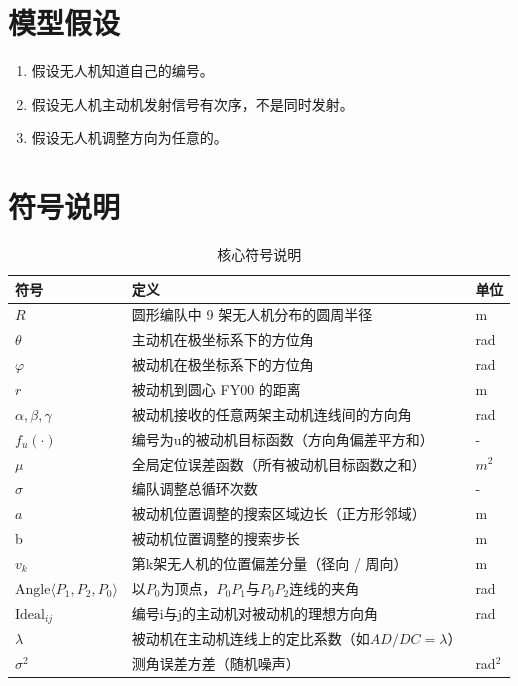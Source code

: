 \documentclass[withoutpreface,bwprint]{cumcmthesis} %
\begin{document}
\section{模型假设}

\begin{enumerate}
    \item 假设无人机知道自己的编号。
    \item 假设无人机主动机发射信号有次序，不是同时发射。
    \item 假设无人机调整方向为任意的。
\end{enumerate}

\section{符号说明}

\begin{table}[H]
    \centering
    \caption{核心符号说明}
    \label{tab_symbols}
    \begin{tabular}{@{}lll@{}}
        \toprule
        \textbf{符号} & \textbf{定义} & \textbf{单位} \\
        \midrule
        $R$  & 圆形编队中 9 架无人机分布的圆周半径 & m\\
        \(\theta\)&主动机在极坐标系下的方位角&rad\\
        \(\varphi\)&被动机在极坐标系下的方位角&rad\\
        $r$&被动机到圆心 FY00 的距离&m\\
        \(\alpha, \beta, \gamma\) & 被动机接收的任意两架主动机连线间的方向角&rad \\ 
        \(f_u(\cdot)\)&编号为u的被动机目标函数（方向角偏差平方和）&-\\
        \(\mu\) & 全局定位误差函数（所有被动机目标函数之和）&$m^2$\\
        \(\sigma\) & 编队调整总循环次数& -\\
        $a$ & 被动机位置调整的搜索区域边长（正方形邻域）& m\\
        b & 被动机位置调整的搜索步长& m\\
        \(v_k\)& 第k架无人机的位置偏差分量（径向 / 周向）& m\\
        \(\text{Angle}\langle P_1, P_2, P_0 \rangle\)& 以\(P_0\)为顶点，\(P_0P_1\)与\(P_0P_2\)连线的夹角&rad\\
        \(\text{Ideal}_{ij}\) &  编号i与j的主动机对被动机的理想方向角 & rad \\
        \(\lambda\)&被动机在主动机连线上的定比系数（如\(AD/DC=\lambda\)）\\
        \(\sigma^2\)&测角误差方差（随机噪声）&rad$^2$\\
        \bottomrule
    \end{tabular}
\end{table}
\end{document}
